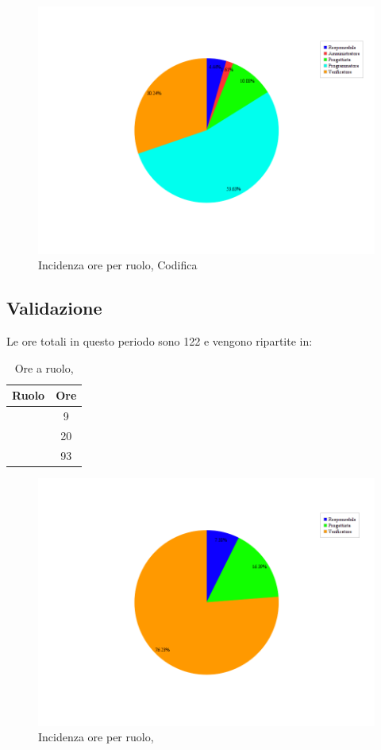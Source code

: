 \begin{figure}[H]
	\centering
	\includegraphics[scale=0.5]{immagini/Grafi/OreRuoloCod}
	\caption{Incidenza ore per ruolo, Codifica}
\end{figure}

\subsection{Validazione}
Le ore totali in questo periodo sono 122 e vengono ripartite in:
\begin{table}[H]
	\begin{center}
		\begin{tabular}{|c|c|}
			\hline
			\textbf{Ruolo}	& \textbf{Ore} \\
			\hline
			\Res	&	9	\\
			\hline
			\Prog		&	20	\\
			\hline
			\Ver	&	93	\\
			\hline
		\end{tabular}
	\end{center}
	\caption{Ore a ruolo, \VV}
\end{table}

\begin{figure}[H]
	\centering
	\includegraphics[scale=0.5]{immagini/Grafi/OreRuoloVerifica}
	\caption{Incidenza ore per ruolo, \VV}
\end{figure}

